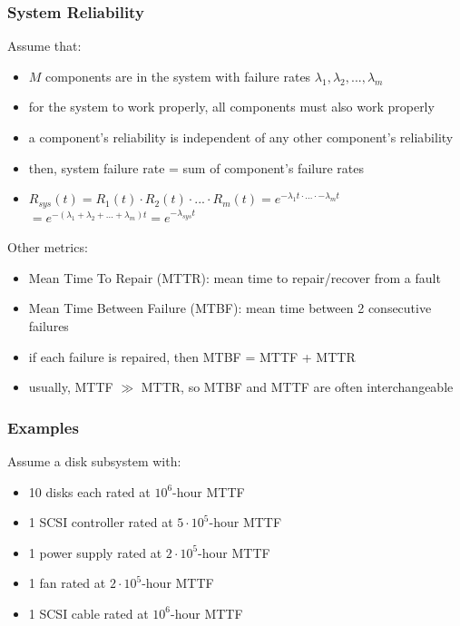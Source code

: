 \documentclass[12pt]{extarticle}
\begin{document}
	\subsubsection{System Reliability}

	Assume that:

	\begin{itemize}
		\item $M$ components are in the system with failure rates $\lambda_1, \lambda_2, ..., \lambda_m$
		\item for the system to work properly, all components must also work properly
		\item a component's reliability is independent of any other component's reliability
		\item then, system failure rate = sum of component's failure rates
		\item $R_{sys}(t) = R_1(t) \cdot R_2(t) \cdot ... \cdot R_m(t) = e^{-\lambda_1 t \cdot ... \cdot -\lambda_mt}$
		$= e^{-(\lambda_1 + \lambda_2 + ... + \lambda_m)t} = e^{-\lambda_{sys}t}$
	\end{itemize}

	Other metrics:

	\begin{itemize}
		\item Mean Time To Repair (MTTR): mean time to repair/recover from a fault
		\item Mean Time Between Failure (MTBF): mean time between 2 consecutive failures
		\item if each failure is repaired, then MTBF = MTTF + MTTR
		\item usually, MTTF $\gg$ MTTR, so MTBF and MTTF are often interchangeable
	\end{itemize}

	\subsubsection{Examples}

	Assume a disk subsystem with:

	\begin{itemize}
		\item 10 disks each rated at $10^6$-hour MTTF
		\item 1 SCSI controller rated at $5 \cdot 10^5$-hour MTTF
		\item 1 power supply rated at $2 \cdot 10^5$-hour MTTF
		\item 1 fan rated at $2 \cdot 10^5$-hour MTTF
		\item 1 SCSI cable rated at $10^6$-hour MTTF
	\end{itemize}
\end{document}
